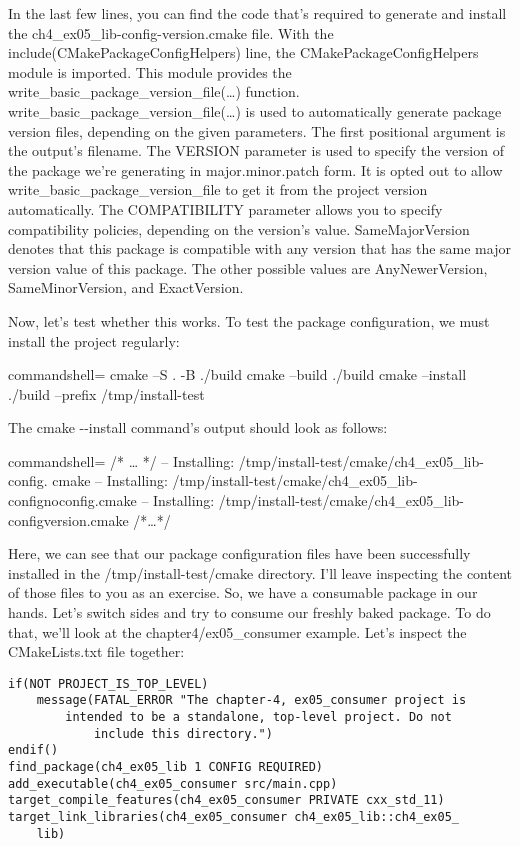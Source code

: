 In the last few lines, you can find the code that's required to generate and install the ch4\_ex05\_lib-config-version.cmake file. With the include(CMakePackageConfigHelpers) line, the CMakePackageConfigHelpers module is imported. This module provides the write\_basic\_package\_version\_file(…) function. write\_basic\_package\_version\_file(…) is used to automatically generate package version files, depending on the given parameters. The first positional argument is the output's filename. The VERSION parameter is used to specify the version of the package we're generating in major.minor.patch form. It is opted out to allow write\_basic\_package\_version\_file to get it from the project version automatically. The COMPATIBILITY parameter allows you to specify compatibility policies, depending on the version's value. SameMajorVersion denotes that this package is compatible with any version that has the same major version value of this package. The other possible values are AnyNewerVersion, SameMinorVersion, and ExactVersion.

Now, let's test whether this works. To test the package configuration, we must install the project regularly:

\begin{tcblisting}{commandshell={}}
cmake –S . -B ./build
cmake --build ./build
cmake --install ./build --prefix /tmp/install-test
\end{tcblisting}

The cmake -{}-install command's output should look as follows:

\begin{tcblisting}{commandshell={}}
/* … */
-- Installing: /tmp/install-test/cmake/ch4_ex05_lib-config.
cmake
-- Installing: /tmp/install-test/cmake/ch4_ex05_lib-confignoconfig.cmake
-- Installing: /tmp/install-test/cmake/ch4_ex05_lib-configversion.cmake
/*…*/
\end{tcblisting}

Here, we can see that our package configuration files have been successfully installed in the /tmp/install-test/cmake directory. I'll leave inspecting the content of those files to you as an exercise. So, we have a consumable package in our hands. Let's switch sides and try to consume our freshly baked package. To do that, we'll look at the chapter4/ex05\_consumer example. Let's inspect the CMakeLists.txt file together:

\begin{lstlisting}[style=styleCMake]
if(NOT PROJECT_IS_TOP_LEVEL)
	message(FATAL_ERROR "The chapter-4, ex05_consumer project is
		intended to be a standalone, top-level project. Do not
			include this directory.")
endif()
find_package(ch4_ex05_lib 1 CONFIG REQUIRED)
add_executable(ch4_ex05_consumer src/main.cpp)
target_compile_features(ch4_ex05_consumer PRIVATE cxx_std_11)
target_link_libraries(ch4_ex05_consumer ch4_ex05_lib::ch4_ex05_
	lib)
\end{lstlisting}

